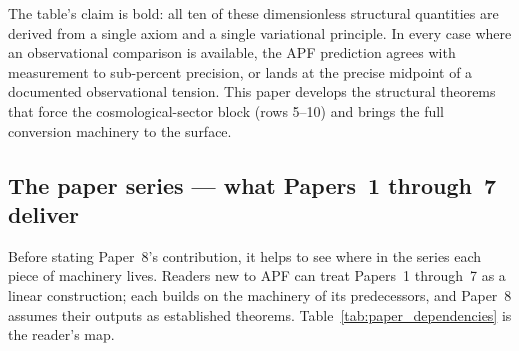 \documentclass[11pt]{article}
\begin{document}
\begin{table}[h]
\end{table}

The table's claim is bold: all ten of these dimensionless structural quantities are derived from a single axiom and a single variational principle. In every case where an observational comparison is available, the APF prediction agrees with measurement to sub-percent precision, or lands at the precise midpoint of a documented observational tension. This paper develops the structural theorems that force the cosmological-sector block (rows 5--10) and brings the full conversion machinery to the surface.

\subsection{The paper series --- what Papers~1 through~7 deliver}\label{sec:intro_series}

Before stating Paper~8's contribution, it helps to see where in the series each piece of machinery lives. Readers new to APF can treat Papers~1 through~7 as a linear construction; each builds on the machinery of its predecessors, and Paper~8 assumes their outputs as established theorems. Table~\ref{tab:paper_dependencies} is the reader's map.
\end{document}
